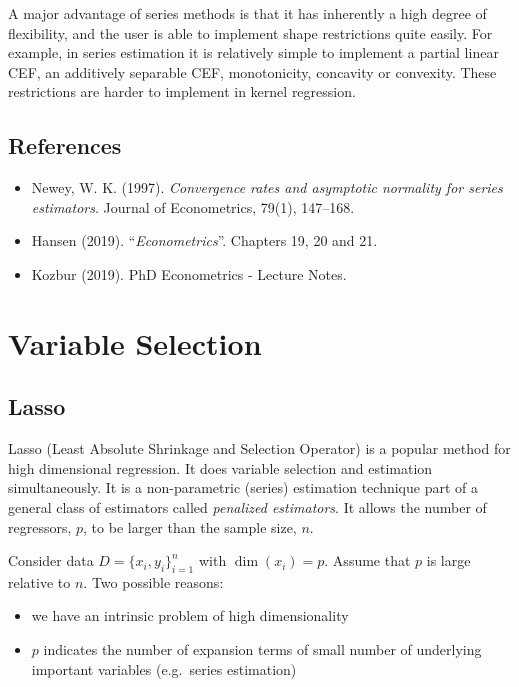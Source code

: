 \documentclass[12pt,]{book}
\providecommand{\tightlist}{%
  \setlength{\itemsep}{0pt}\setlength{\parskip}{0pt}}
\begin{document}
A major advantage of series methods is that it has inherently a high degree of flexibility, and the user is able to implement shape restrictions quite easily. For example, in series estimation it is relatively simple to implement a partial linear CEF, an additively separable CEF, monotonicity, concavity or convexity. These restrictions are harder to implement in kernel regression.

\hypertarget{references-7}{%
\section{References}\label{references-7}}

\begin{itemize}
\tightlist
\item
  Newey, W. K. (1997). \emph{Convergence rates and asymptotic normality for series estimators}. Journal of Econometrics, 79(1), 147--168.
\item
  Hansen (2019). ``\emph{Econometrics}''. Chapters 19, 20 and 21.
\item
  Kozbur (2019). PhD Econometrics - Lecture Notes.
\end{itemize}

\hypertarget{lecture5}{%
\chapter{Variable Selection}\label{lecture5}}

\hypertarget{lasso}{%
\section{Lasso}\label{lasso}}

Lasso (Least Absolute Shrinkage and Selection Operator) is a popular method for high dimensional regression. It does variable selection and estimation simultaneously. It is a non-parametric (series) estimation technique part of a general class of estimators called \emph{penalized estimators}. It allows the number of regressors, \(p\), to be larger than the sample size, \(n\).

Consider data \(D = \{ x_i, y_i \}_{i=1}^n\) with \(\dim (x_i) = p\). Assume that \(p\) is large relative to \(n\). Two possible reasons:

\begin{itemize}
\tightlist
\item
  we have an intrinsic problem of high dimensionality
\item
  \(p\) indicates the number of expansion terms of small number of underlying important variables (e.g.~series estimation)
\end{itemize}
\end{document}
